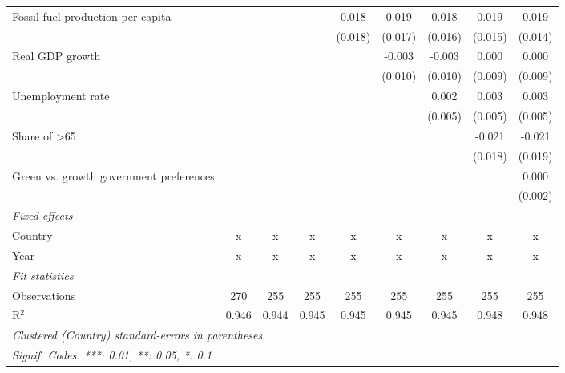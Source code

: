 \begin{table}[htbp]
\begin{tabular}{lcccccccc}
      Fossil fuel production per capita       &                &                &         & 0.018   & 0.019   & 0.018   & 0.019   & 0.019\\   
                                              &                &                &         & (0.018) & (0.017) & (0.016) & (0.015) & (0.014)\\   
      Real GDP growth                         &                &                &         &         & -0.003  & -0.003  & 0.000   & 0.000\\   
                                              &                &                &         &         & (0.010) & (0.010) & (0.009) & (0.009)\\   
      Unemployment rate                       &                &                &         &         &         & 0.002   & 0.003   & 0.003\\   
                                              &                &                &         &         &         & (0.005) & (0.005) & (0.005)\\   
      Share of >65                            &                &                &         &         &         &         & -0.021  & -0.021\\   
                                              &                &                &         &         &         &         & (0.018) & (0.019)\\   
      Green vs. growth government preferences &                &                &         &         &         &         &         & 0.000\\   
                                              &                &                &         &         &         &         &         & (0.002)\\   
      \emph{Fixed effects}\\
      Country                                 & x              & x              & x       & x       & x       & x       & x       & x\\  
      Year                                    & x              & x              & x       & x       & x       & x       & x       & x\\  
      \midrule \emph{Fit statistics}\\
      Observations                            & 270            & 255            & 255     & 255     & 255     & 255     & 255     & 255\\  
      R$^2$                                   & 0.946          & 0.944          & 0.945   & 0.945   & 0.945   & 0.945   & 0.948   & 0.948\\  
      \midrule
      \multicolumn{9}{l}{\emph{Clustered (Country) standard-errors in parentheses}}\\
      \multicolumn{9}{l}{\emph{Signif. Codes: ***: 0.01, **: 0.05, *: 0.1}}\\
   \end{tabular}
\end{table}


